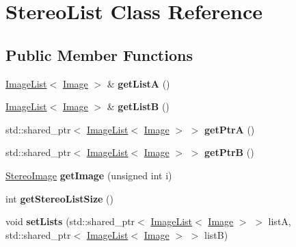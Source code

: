 \hypertarget{classStereoList}{}\section{Stereo\+List Class Reference}
\label{classStereoList}
\subsection*{Public Member Functions}
\begin{DoxyCompactItemize}
\item 
\hyperlink{classImageList}{Image\+List}$<$ \hyperlink{classImage}{Image} $>$ \& {\bfseries get\+ListA} ()\hypertarget{classStereoList_a15a3b136d0a6cc26b204b8b15105ad1c}{}\label{classStereoList_a15a3b136d0a6cc26b204b8b15105ad1c}

\item 
\hyperlink{classImageList}{Image\+List}$<$ \hyperlink{classImage}{Image} $>$ \& {\bfseries get\+ListB} ()\hypertarget{classStereoList_a004c4cfcca293a5e232fef5e97b66352}{}\label{classStereoList_a004c4cfcca293a5e232fef5e97b66352}

\item 
std\+::shared\+\_\+ptr$<$ \hyperlink{classImageList}{Image\+List}$<$ \hyperlink{classImage}{Image} $>$ $>$ {\bfseries get\+PtrA} ()\hypertarget{classStereoList_a6eaf6a8512791f689fcaef58d1375027}{}\label{classStereoList_a6eaf6a8512791f689fcaef58d1375027}

\item 
std\+::shared\+\_\+ptr$<$ \hyperlink{classImageList}{Image\+List}$<$ \hyperlink{classImage}{Image} $>$ $>$ {\bfseries get\+PtrB} ()\hypertarget{classStereoList_a945835db43ae6ca1627f84715413b3b8}{}\label{classStereoList_a945835db43ae6ca1627f84715413b3b8}

\item 
\hyperlink{classStereoImage}{Stereo\+Image} {\bfseries get\+Image} (unsigned int i)\hypertarget{classStereoList_aa3d45661166e86306a662c4f5a798707}{}\label{classStereoList_aa3d45661166e86306a662c4f5a798707}

\item 
int {\bfseries get\+Stereo\+List\+Size} ()\hypertarget{classStereoList_a49899f119f9223c3f43139bd96f37748}{}\label{classStereoList_a49899f119f9223c3f43139bd96f37748}

\item 
void {\bfseries set\+Lists} (std\+::shared\+\_\+ptr$<$ \hyperlink{classImageList}{Image\+List}$<$ \hyperlink{classImage}{Image} $>$ $>$ listA, std\+::shared\+\_\+ptr$<$ \hyperlink{classImageList}{Image\+List}$<$ \hyperlink{classImage}{Image} $>$ $>$ listB)\hypertarget{classStereoList_a6fb75304f6b0bb673374ce7b9bc913ae}{}\label{classStereoList_a6fb75304f6b0bb673374ce7b9bc913ae}


\end{DoxyCompactItemize}
